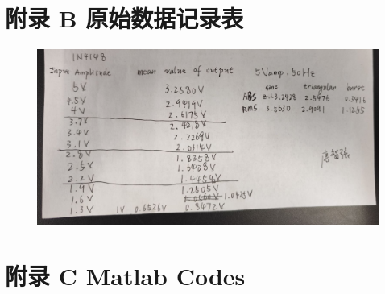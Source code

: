 \documentclass[UTF8]{article}
\begin{document}
\section*{附录 B\hspace*{20pt} 原始数据记录表}
\thispagestyle{fancy} 
\begin{figure}[H]\centering
    \includegraphics[width=\columnwidth]{LCE-05-精密整流/assets/appendix/image copy.png}
\end{figure}


\section*{附录 C \hspace*{20pt} Matlab Codes}
\thispagestyle{fancy} 

\end{document}
